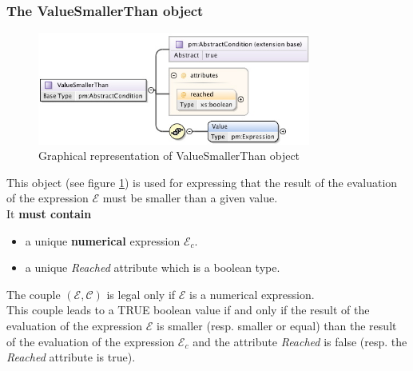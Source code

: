 \documentclass[a4paper,11pt] {article}
\begin{document}
\subsubsection{The ValueSmallerThan object}
\begin{figure}[htbp]
\begin{center}
\includegraphics[width=0.8\textwidth]{pictures/ValueSmallerThan.jpg} 
\caption{Graphical representation of ValueSmallerThan object}
\label{Pic-ValueSmallerThan}
\end{center}
\end{figure}
This object (see figure \ref{Pic-ValueSmallerThan}) is used for expressing that the result of the
evaluation of the expression $\mathcal E$ must be smaller than a given value.\\
It {\bf must contain}
\begin{itemize}
\item a unique {\bf numerical} expression $\mathcal E_c$. 
\item a unique {\it Reached} attribute which is a boolean type.
\end{itemize}
The couple $(\mathcal E, \mathcal C)$ is legal only if $\mathcal E$ is a numerical expression.\\
This couple leads to a TRUE boolean value if and only if the result of the evaluation of the
expression $\mathcal E$ is smaller (resp. smaller or equal) than the result of the evaluation of the
expression $\mathcal E_c$ and the attribute {\it Reached} is false (resp. the {\it Reached}
attribute is true).
\end{document}
